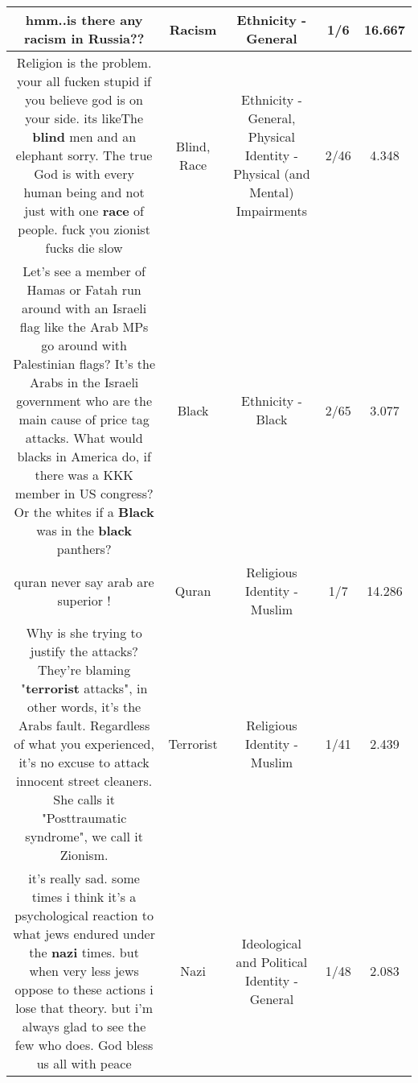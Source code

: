 \documentclass[11pt]{article}
\newlength\mylength
\begin{document}
\begin{center}
\begin{longtable}{|C{.65\mylength}|C{.30\mylength}|C{.12\mylength}|C{.12\mylength}|C{.12\mylength}|}
  \small hmm..is there any \textbf{racism} in Russia??\normalsize   & Racism & Ethnicity - General & 1/6 & 16.667 \\  \hline
  \small Religion is the problem. your all fucken stupid if you believe god is on your side. its likeThe \textbf{blind} men and an elephant sorry. The true God is with every human being and not just with one \textbf{race} of people. fuck you zionist fucks die slow\normalsize   & Blind, Race & Ethnicity - General, Physical Identity - Physical (and Mental) Impairments & 2/46 & 4.348 \\  \hline
  \small Let's see a member of Hamas or Fatah run around with an Israeli flag like the Arab MPs go around with Palestinian flags? It's the Arabs in the Israeli government who are the main cause of price tag attacks. What would blacks in America do, if there was a KKK member in US congress? Or the whites if a \textbf{Black} was in the \textbf{black} panthers?\normalsize   & Black & Ethnicity - Black & 2/65 & 3.077 \\  \hline
  \small quran never say arab are superior !\normalsize   & Quran & Religious Identity - Muslim & 1/7 & 14.286 \\  \hline
  \small Why is she trying to justify the attacks? They're blaming "\textbf{terrorist} attacks", in other words, it's the Arabs fault. Regardless of what you experienced, it's no excuse to attack innocent street cleaners. She calls it "Posttraumatic syndrome", we call it Zionism.\normalsize   & Terrorist & Religious Identity - Muslim & 1/41 & 2.439 \\  \hline
  \small it's really sad. some times i think it's a psychological reaction to what jews endured under the \textbf{nazi} times. but when very less jews oppose to these actions i lose that theory. but i'm always glad to see the few who does. God bless us all with peace\normalsize   & Nazi &  Ideological and Political Identity - General & 1/48 & 2.083 \\  \hline

\end{longtable}
\end{center}
\end{document}
